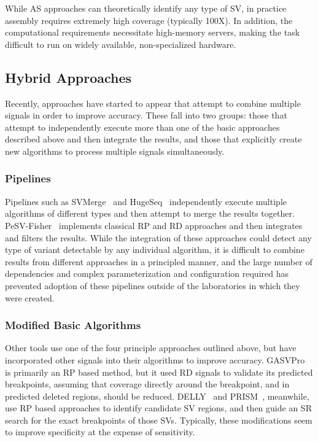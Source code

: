 \documentclass [11pt] {report}
\begin{document}
While AS approaches can theoretically identify any type of SV, in practice assembly requires extremely high coverage (typically 100X). In addition, the computational requirements necessitate high-memory servers, making the task difficult to run on widely available, non-specialized hardware.

\subsection{Hybrid Approaches}

Recently, approaches have started to appear that attempt to combine multiple signals in order to improve accuracy. These fall into two groups: those that attempt to independently execute more than one of the basic approaches described above and then integrate the results, and those that explicitly create new algorithms to process multiple signals simultaneously.

\subsubsection{Pipelines}

Pipelines such as SVMerge~\cite{Wong:2010p1271} and HugeSeq~\cite{Lam:2012jy} independently execute multiple algorithms of different types and then attempt to merge the results together. PeSV-Fisher~\cite{Escaramis:2013dm} implements classical RP and RD approaches and then integrates and filters the results. While the integration of these approaches could detect any type of variant detectable by any individual algorithm, it is difficult to combine results from different approaches in a principled manner, and the large number of dependencies and complex parameterization and configuration required has prevented adoption of these pipelines outside of the laboratories in which they were created.

\subsubsection{Modified Basic Algorithms}

Other tools use one of the four principle approaches outlined above, but have incorporated other signals into their algorithms to improve accuracy. GASVPro~\cite{Sindi:2012kk} is primarily an RP based method, but it used RD signals to validate its predicted breakpoints, assuming that coverage directly around the breakpoint, and in predicted deleted regions, should be reduced. DELLY~\cite{Rausch:2012he} and PRISM~\cite{Jiang:2012cp}, meanwhile, use RP based approaches to identify candidate SV regions, and then guide an SR search for the exact breakpoints of those SVs. Typically, these modifications seem to improve specificity at the expense of sensitivity.
\end{document}
